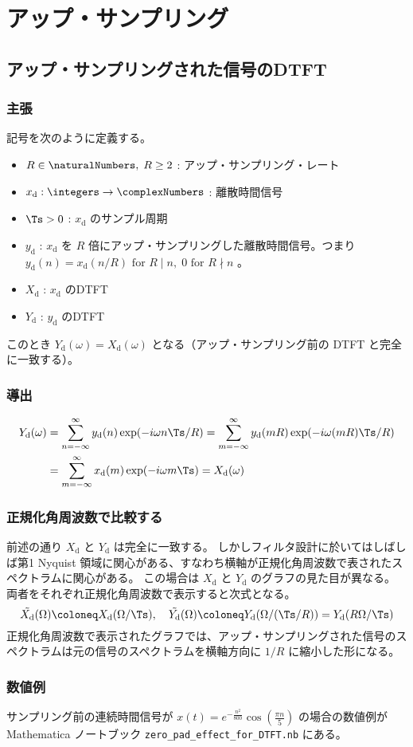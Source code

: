 \chapter{アップ・サンプリング}
    \section{アップ・サンプリングされた信号のDTFT}
        \newcommand{\xd}{x_\text{d}}
        \newcommand{\yd}{y_\text{d}}
        \newcommand{\Xd}{X_\text{d}}
        \newcommand{\Yd}{Y_\text{d}}
        \subsection{主張}
            記号を次のように定義する。
            \begin{itemize}
                \item $R\in\naturalNumbers,\;R\geq 2$ : アップ・サンプリング・レート
                \item $\xd:\integers\to\complexNumbers$ : 離散時間信号
                \item $\Ts>0$ : $\xd$ のサンプル周期
                \item $\yd$ : $\xd$ を $R$ 倍にアップ・サンプリングした離散時間信号。つまり $\yd(n) = \xd(n/R)\text{ for }R\mid n,\;0\text{ for }R\nmid n$ 。
                \item $\Xd$ : $\xd$ のDTFT
                \item $\Yd$ : $\yd$ のDTFT
            \end{itemize}
            このとき $\Yd(\omega) = \Xd(\omega)$ となる（アップ・サンプリング前の DTFT と完全に一致する）。
        \subsection{導出}
            \begin{align*}
                \Yd(\omega) &= \sum_{n=-\infty}^\infty \yd(n)\exp(-i\omega n\Ts/R) = \sum_{m=-\infty}^\infty \yd(mR)\exp(-i\omega (mR)\Ts/R) \\
                &= \sum_{m=-\infty}^\infty \xd(m)\exp(-i\omega m\Ts) = \Xd(\omega)
            \end{align*}
        \subsection{正規化角周波数で比較する}
            前述の通り $\Xd$ と $\Yd$ は完全に一致する。
            しかしフィルタ設計に於いてはしばしば第1 Nyquist 領域に関心がある、すなわち横軸が正規化角周波数で表されたスペクトラムに関心がある。
            この場合は $\Xd$ と $\Yd$ のグラフの見た目が異なる。\\
            両者をそれぞれ正規化角周波数で表示すると次式となる。
            \[ \tilde{\Xd}(\Omega) \coloneq \Xd(\Omega/\Ts),\quad \tilde{\Yd}(\Omega) \coloneq \Yd(\Omega/(\Ts/R)) = \Yd(R\Omega/\Ts) \]
            正規化角周波数で表示されたグラフでは、アップ・サンプリングされた信号のスペクトラムは元の信号のスペクトラムを横軸方向に $1/R$ に縮小した形になる。
        \subsection{数値例}
            サンプリング前の連続時間信号が $x(t) = e^{-\frac{n^2}{800}}\cos\left(\frac{\pi n}{5}\right)$ の場合の数値例が Mathematica ノートブック \verb|zero_pad_effect_for_DTFT.nb| にある。


